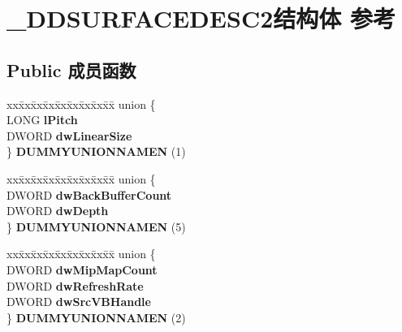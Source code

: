 \hypertarget{struct___d_d_s_u_r_f_a_c_e_d_e_s_c2}{}\section{\+\_\+\+D\+D\+S\+U\+R\+F\+A\+C\+E\+D\+E\+S\+C2结构体 参考}
\label{struct___d_d_s_u_r_f_a_c_e_d_e_s_c2}
\subsection*{Public 成员函数}
\begin{DoxyCompactItemize}
\item 
\mbox{\label{struct___d_d_s_u_r_f_a_c_e_d_e_s_c2_a9c6f0a70ee76203ff8337d6dfbd8838d}} 
\begin{tabbing}
xx\=xx\=xx\=xx\=xx\=xx\=xx\=xx\=xx\=\kill
union \{\\
\>LONG {\bfseries lPitch}\\
\>DWORD {\bfseries dwLinearSize}\\
\} {\bfseries DUMMYUNIONNAMEN} (1)\\

\end{tabbing}\item 
\mbox{\label{struct___d_d_s_u_r_f_a_c_e_d_e_s_c2_a4ac4e21de85570a1a71b465f71200fc4}} 
\begin{tabbing}
xx\=xx\=xx\=xx\=xx\=xx\=xx\=xx\=xx\=\kill
union \{\\
\>DWORD {\bfseries dwBackBufferCount}\\
\>DWORD {\bfseries dwDepth}\\
\} {\bfseries DUMMYUNIONNAMEN} (5)\\

\end{tabbing}\item 
\mbox{\label{struct___d_d_s_u_r_f_a_c_e_d_e_s_c2_affcbb0dd53ecf780bd435794ba3724c6}} 
\begin{tabbing}
xx\=xx\=xx\=xx\=xx\=xx\=xx\=xx\=xx\=\kill
union \{\\
\>DWORD {\bfseries dwMipMapCount}\\
\>DWORD {\bfseries dwRefreshRate}\\
\>DWORD {\bfseries dwSrcVBHandle}\\
\} {\bfseries DUMMYUNIONNAMEN} (2)\\


\end{tabbing}
\end{DoxyCompactItemize}
